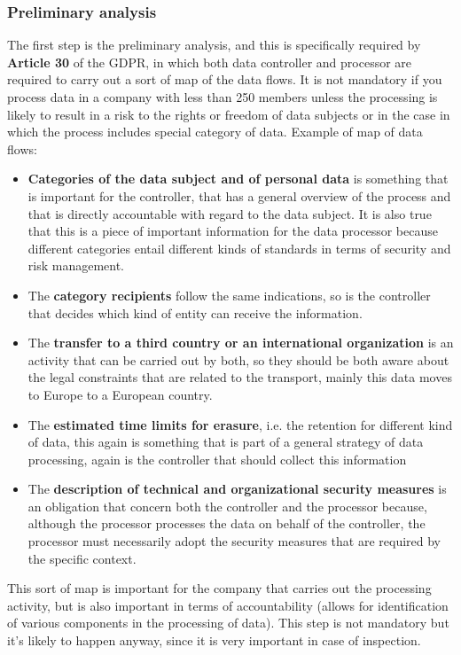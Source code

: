 \subsubsection{Preliminary analysis}
The first step is the preliminary analysis, and this is specifically required by \textbf{Article 30} of the GDPR, in which both data controller and processor are required to carry out a sort of map of the data flows. It is not mandatory if you process data in a company with less than 250 members unless the processing is likely to result in a risk to the rights or freedom of data subjects or in the case in which the process includes special category of data.
Example of map of data flows:
\begin{itemize}
    \item \textbf{Categories of the data subject and of personal data} is something that is important for the controller, that has a general overview of the process and that is directly accountable with regard to the data subject. It is also true that this is a piece of important information for the data processor because different categories entail different kinds of standards in terms of security and risk management.
    \item The \textbf{category recipients} follow the same indications, so is the controller that decides which kind of entity can receive the information.
    \item The \textbf{transfer to a third country or an international organization} is an activity that can be carried out by both, so they should be both aware about the legal constraints that are related to the transport, mainly this data moves to Europe to a European country.
    \item The \textbf{estimated time limits for erasure}, i.e. the retention for different kind of data, this again is something that is part of a general strategy of data processing, again is the controller that should collect this information
    \item The \textbf{description of technical and organizational security measures} is an obligation that concern both the controller and the processor because, although the processor processes the data on behalf of the controller, the processor must necessarily adopt the security measures that are required by the specific context.
\end{itemize}

This sort of map is important for the company that carries out the processing activity, but is also important in terms of accountability (allows for identification of various components in the processing of data). This step is not mandatory but it's likely to happen anyway, since it is very important in case of inspection.

